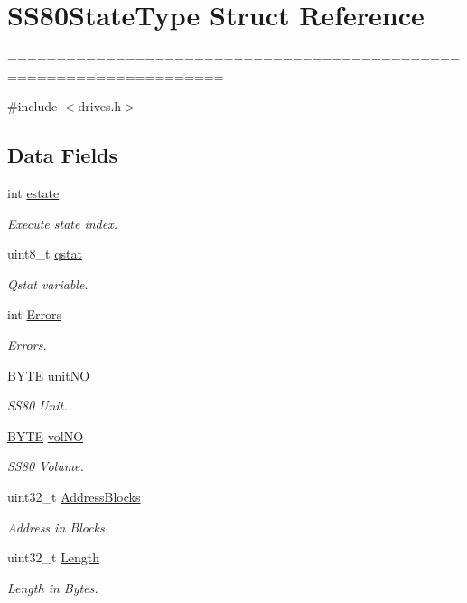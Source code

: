 \hypertarget{structSS80StateType}{}\section{S\+S80\+State\+Type Struct Reference}
\label{structSS80StateType}


====================================================================  




{\ttfamily \#include $<$drives.\+h$>$}

\subsection*{Data Fields}
\begin{DoxyCompactItemize}
\item 
int \hyperlink{structSS80StateType_ae4a94143cb4201687be4e33684be057e}{estate}
\begin{DoxyCompactList}\small\item\em Execute state index. \end{DoxyCompactList}\item 
uint8\+\_\+t \hyperlink{structSS80StateType_ad4911c7b89ec1ff2c0aa01881b1e3d3a}{qstat}
\begin{DoxyCompactList}\small\item\em Qstat variable. \end{DoxyCompactList}\item 
int \hyperlink{structSS80StateType_a7a5c363c6f617ee457a4daacadb3a7b2}{Errors}
\begin{DoxyCompactList}\small\item\em Errors. \end{DoxyCompactList}\item 
\hyperlink{integer_8h_a4ae1dab0fb4b072a66584546209e7d58}{B\+Y\+TE} \hyperlink{structSS80StateType_ad2b3cd5353f5650df931520a39b385e7}{unit\+NO}
\begin{DoxyCompactList}\small\item\em S\+S80 Unit. \end{DoxyCompactList}\item 
\hyperlink{integer_8h_a4ae1dab0fb4b072a66584546209e7d58}{B\+Y\+TE} \hyperlink{structSS80StateType_ac197866db7677ec4bf9ad5e29e4a58a3}{vol\+NO}
\begin{DoxyCompactList}\small\item\em S\+S80 Volume. \end{DoxyCompactList}\item 
uint32\+\_\+t \hyperlink{structSS80StateType_a6cffa1e36a57bce4188ede4bd9dbd7ad}{Address\+Blocks}
\begin{DoxyCompactList}\small\item\em Address in Blocks. \end{DoxyCompactList}\item 
uint32\+\_\+t \hyperlink{structSS80StateType_a507159f0a0a4f3127488081fd618e8f6}{Length}
\begin{DoxyCompactList}\small\item\em Length in Bytes. \end{DoxyCompactList}\end{DoxyCompactItemize}



